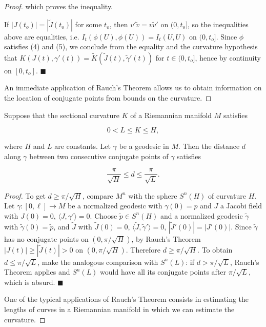 \begin{proof}
  which proves the inequality.
  
  If $|J(t_o)|=|\tilde J(t_o)|$ for some $t_o$, then $v'\tilde v=v\tilde v'$ on
  $(0,t_o]$, so the inequalities above are equalities, i.e.
  $I_t(\phi(U),\phi(U))=I_t(U,U)$ on $(0,t_o]$. Since $\phi$ satisfies (4) and (5),
  we conclude from the equality and the curvature hypothesis that
  $K(J(t),\gamma'(t))=\widetilde{K}(\tilde J(t),\tilde\gamma'(t))$ for $t\in(0,t_o]$,
  hence by continuity on $[0,t_o]$. $\blacksquare$
  
  An immediate application of Rauch's Theorem allows us to obtain information on the
  location of conjugate points from bounds on the curvature.
\end{proof}

\begin{proposition}[Proposition 2.4]
  \label{prop:dc-ch10-2-4}
  Suppose that the sectional curvature $K$ of a Riemannian manifold $M$ satisfies
  
  $$
  0<L\leq K\leq H,
  $$
  
  where $H$ and $L$ are constants. Let $\gamma$ be a geodesic in $M$. Then the
  distance $d$ along $\gamma$ between two consecutive conjugate points of $\gamma$
  satisfies
  
  $$
  \frac{\pi}{\sqrt{H}}\leq d\leq\frac{\pi}{\sqrt{L}}.
  $$
\end{proposition}
\begin{proof}
  To get $d\geq\pi/\sqrt{H}$, compare $M^n$ with the sphere $S^n(H)$ of
  curvature $H$. Let $\gamma:[0,\ell]\to M$ be a normalized geodesic with
  $\gamma(0)=p$ and $J$ a Jacobi field with $J(0)=0$, $\langle J,\gamma'\rangle=0$.
  Choose $\tilde p\in S^n(H)$ and a normalized geodesic $\tilde\gamma$ with
  $\tilde\gamma(0)=\tilde p$, and $\tilde J$ with $\tilde J(0)=0$,
  $\langle\tilde J,\tilde\gamma'\rangle=0$, $|\tilde J'(0)|=|J'(0)|$. Since
  $\tilde\gamma$ has no conjugate points on $(0,\pi/\sqrt{H})$, by Rauch's Theorem
  $|J(t)|\geq|\tilde J(t)|>0$ on $(0,\pi/\sqrt{H})$. Therefore $d\geq\pi/\sqrt{H}$.
  To obtain $d\leq\pi/\sqrt{L}$, make the analogous comparison with $S^n(L)$: if
  $d>\pi/\sqrt{L}$, Rauch's Theorem applies and $S^n(L)$ would have all its
  conjugate points after $\pi/\sqrt{L}$, which is absurd. $\blacksquare$
  
  One of the typical applications of Rauch's Theorem consists in estimating the
  lengths of curves in a Riemannian manifold in which we can estimate the
  curvature.
\end{proof}

